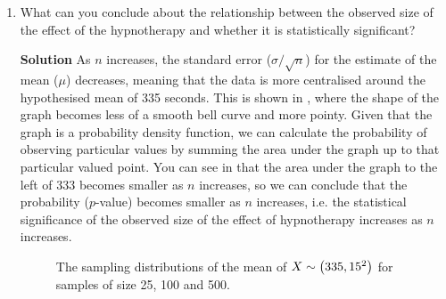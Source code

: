 \begin{enumerate}
\begin{enumerate}
        \item What can you conclude about the relationship between the observed size of the effect of the hypnotherapy and whether it is statistically significant?
        \begin{framed}{\textbf{Solution}}
        As $n$ increases, the standard error ($\sigma/\sqrt{n}$) for the estimate of the mean ($\mu$) decreases, meaning that the data is more centralised around the hypothesised mean of 335 seconds. This is shown in , where the shape of the graph becomes less of a smooth bell curve and more pointy. Given that the graph is a probability density function, we can calculate the probability of observing particular values by summing the area under the graph up to that particular valued point. You can see in  that the area under the graph to the left of 333 becomes smaller as $n$ increases, so we can conclude that the probability ($p$-value) becomes smaller as $n$ increases, i.e. the statistical significance of the observed size of the effect of hypnotherapy increases as $n$ increases.
        \end{framed}
        \FloatBarrier
        \begin{figure}[h]
            \centering
        \caption{The sampling distributions of the mean of $X \sim \left( 335, 15^2\right)$ for samples of size 25, 100 and 500.}
        \label{fig:hw2q3d}
        \end{figure}
        \FloatBarrier
    \end{enumerate}
\end{enumerate}

